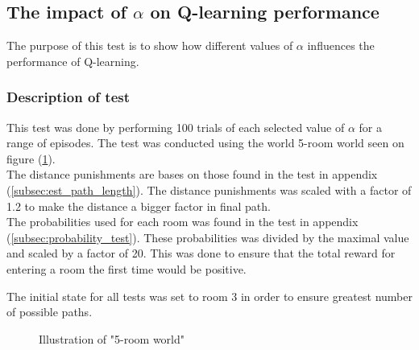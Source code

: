 \documentclass[../Head/Main.tex]{subfiles}
\begin{document}
\subsection{The impact of $\alpha$ on Q-learning performance}
\label{subsec:test_alpha}
The purpose of this test is to show how different values of $\alpha$ influences the performance of Q-learning.
\subsubsection*{Description of test}
This test was done by performing 100 trials of each selected value of $\alpha$ for a range of episodes. The test was conducted using the world 5-room world seen on figure (\ref{fig:5_room_world_alpha}).\\
The distance punishments are bases on those found in the test in appendix (\ref{subsec:est_path_length}). The distance punishments was scaled with a factor of 1.2 to make the distance a bigger factor in final path.\\
The probabilities used for each room was found in the test in appendix (\ref{subsec:probability_test}). These probabilities was divided by the maximal value and scaled by a factor of 20. This was done to ensure that the total reward for entering a room the first time would be positive.\par 
The initial state for all tests was set to room 3 in order to ensure greatest number of possible paths.

\begin{figure}[H]
	\centering
		
	\caption{Illustration of "5-room world"}
	\label{fig:5_room_world_alpha}
\end{figure}
\end{document}

